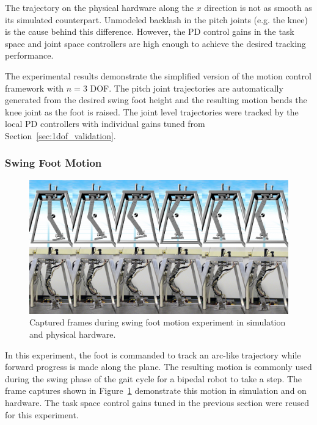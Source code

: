 The trajectory on the physical hardware along the $x$ direction is not as smooth as its simulated counterpart. Unmodeled backlash in the pitch joints (e.g. the knee) is the cause behind this difference. However, the PD control gains in the task space and joint space controllers are high enough to achieve the desired tracking performance. 

The experimental results demonstrate the simplified version of the motion control framework with $n = 3$ DOF. The pitch joint trajectories are automatically generated from the desired swing foot height and the resulting motion bends the knee joint as the foot is raised. The joint level trajectories were tracked by the local PD controllers with individual gains tuned from Section~\ref{sec:1dof_validation}. 


\subsubsection{Swing Foot Motion} %
\label{ssub:swing_foot_motion}

\begin{figure}[!b]
	\centering
    \includegraphics[scale=0.38]{fig/experiments/swingmotionframes.png} 
  	\caption{Captured frames during swing foot motion experiment in simulation and physical hardware.}
	\label{fig:swingmotionframes}
\end{figure}

In this experiment, the foot is commanded to track an arc-like trajectory while forward progress is made along the plane. The resulting motion is commonly used during the swing phase of the gait cycle for a bipedal robot to take a step. The frame captures shown in Figure~\ref{fig:swingmotionframes} demonstrate this motion in simulation and on hardware. The task space control gains tuned in the previous section were reused for this experiment. 

